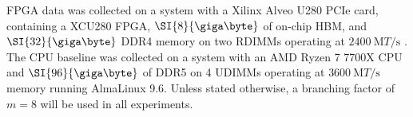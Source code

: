 
FPGA data was collected on a system with a Xilinx Alveo U280 PCIe card,
containing a XCU280 FPGA, $\SI{8}{\giga\byte}$ of on-chip HBM, and
$\SI{32}{\giga\byte}$ DDR4 memory on two RDIMMs operating at
$\SI{2400}{\mega{T}\per\second}$ \autocite{u280}. The CPU baseline was collected
on a system with an AMD Ryzen 7 7700X CPU and $\SI{96}{\giga\byte}$ of DDR5 on 4
UDIMMs operating at $\SI{3600}{\mega{T}\per\second}$ memory running AlmaLinux
9.6.
%
Unless stated otherwise, a branching factor of $m=8$ will be used in all
experiments.
